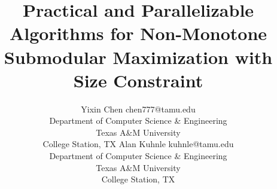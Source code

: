 \documentclass[twoside,11pt]{article}
\begin{document}
\title{Practical and Parallelizable Algorithms for Non-Monotone Submodular Maximization with Size Constraint}


  \author{\name Yixin Chen \email chen777@tamu.edu \\
       \addr Department of Computer Science \& Engineering\\
        Texas A\&M University\\
         College Station, TX
       \AND
       \name Alan Kuhnle \email kuhnle@tamu.edu \\
       \addr Department of Computer Science \& Engineering\\
         Texas A\&M University\\
         College Station, TX}


\maketitle








\clearpage
\appendix






\end{document}
